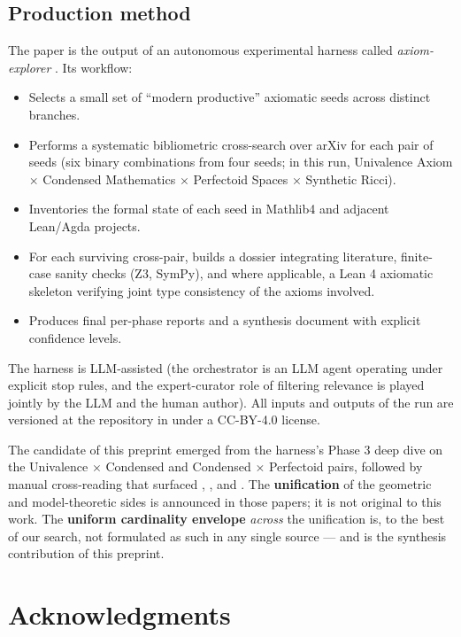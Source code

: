 \documentclass[11pt]{article}
\theoremstyle{definition}
\theoremstyle{plain}
\theoremstyle{remark}
\begin{document}
\subsection{Production method}

The paper is the output of an autonomous experimental harness called
\emph{axiom-explorer} \cite{Vera2026Methodology, AxiomExplorerRepo}. Its workflow:

\begin{itemize}
\item Selects a small set of ``modern productive'' axiomatic seeds across
distinct branches.
\item Performs a systematic bibliometric cross-search over arXiv for each
pair of seeds (six binary combinations from four seeds; in this run,
Univalence Axiom $\times$ Condensed Mathematics $\times$ Perfectoid Spaces
$\times$ Synthetic Ricci).
\item Inventories the formal state of each seed in Mathlib4 and adjacent
Lean/Agda projects.
\item For each surviving cross-pair, builds a dossier integrating literature,
finite-case sanity checks (Z3, SymPy), and where applicable, a Lean 4
axiomatic skeleton verifying joint type consistency of the axioms involved.
\item Produces final per-phase reports and a synthesis document with
explicit confidence levels.
\end{itemize}

The harness is LLM-assisted (the orchestrator is an LLM agent operating
under explicit stop rules, and the expert-curator role of filtering
relevance is played jointly by the LLM and the human author). All inputs and
outputs of the run are versioned at the repository in
\cite{AxiomExplorerRepo} under a CC-BY-4.0 license.

The candidate of this preprint emerged from the harness's Phase 3 deep dive
on the Univalence $\times$ Condensed and Condensed $\times$ Perfectoid pairs,
followed by manual cross-reading that surfaced \cite{Haine2026classifying},
\cite{BergfalkLH2024}, \cite{BLHS2023} and \cite{BannisterBasak2026}. The
\textbf{unification} of the geometric and model-theoretic sides is announced
in those papers; it is not original to this work. The \textbf{uniform
cardinality envelope} \emph{across} the unification is, to the best of our
search, not formulated as such in any single source --- and is the synthesis
contribution of this preprint.

\section{Acknowledgments}
\end{document}
